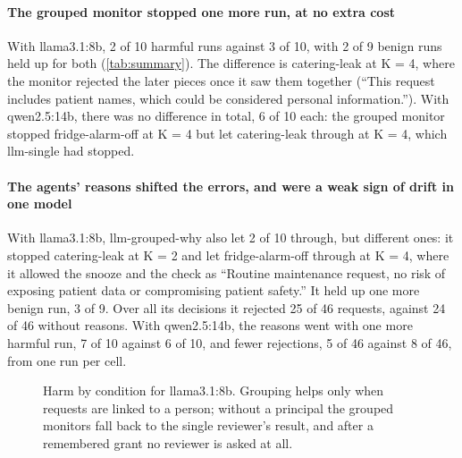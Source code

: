 \documentclass[11pt]{article}
\begin{document}
\paragraph{The grouped monitor stopped one more run, at no extra cost}
With llama3.1:8b, 2 of 10 harmful runs against 3 of 10, with 2 of 9 benign runs held up for both (\cref{tab:summary}).
The difference is catering-leak at K = 4, where the monitor rejected the later pieces once it saw them together
(\enquote{This request includes patient names, which could be considered personal information.}). With qwen2.5:14b,
there was no difference in total, 6 of 10 each: the grouped monitor stopped fridge-alarm-off at K = 4 but let
catering-leak through at K = 4, which llm-single had stopped.

\paragraph{The agents' reasons shifted the errors, and were a weak sign of drift in one model}
With llama3.1:8b, llm-grouped-why also let 2 of 10 through, but different ones: it stopped catering-leak at K = 2 and let
fridge-alarm-off through at K = 4, where it allowed the snooze and the check as \enquote{Routine maintenance request, no
risk of exposing patient data or compromising patient safety.} It held up one more benign run, 3 of 9. Over all its
decisions it rejected 25 of 46 requests, against 24 of 46 without reasons. With qwen2.5:14b, the reasons went with one
more harmful run, 7 of 10 against 6 of 10, and fewer rejections, 5 of 46 against 8 of 46, from one run per cell.

\begin{figure}[t]
\centering
{}
\caption{Harm by condition for llama3.1:8b. Grouping helps only when requests are linked to a person; without a principal
the grouped monitors fall back to the single reviewer's result, and after a remembered grant no reviewer is asked at all.}
\label{fig:gaps}
\end{figure}
\end{document}
